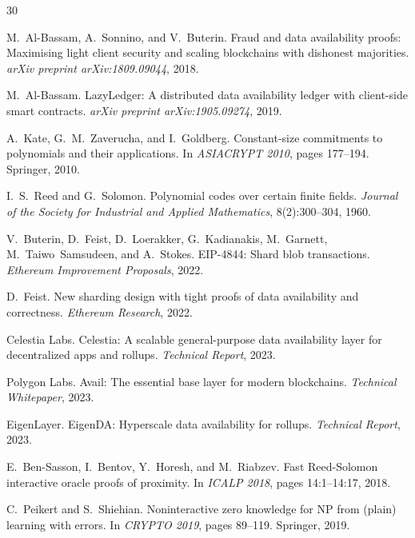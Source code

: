 \newpage

\begin{thebibliography}{30}

M.~Al-Bassam, A.~Sonnino, and V.~Buterin.
\newblock Fraud and data availability proofs: Maximising light client security
  and scaling blockchains with dishonest majorities.
\newblock \emph{arXiv preprint arXiv:1809.09044}, 2018.

M.~Al-Bassam.
\newblock LazyLedger: A distributed data availability ledger with client-side
  smart contracts.
\newblock \emph{arXiv preprint arXiv:1905.09274}, 2019.

A.~Kate, G.~M.~Zaverucha, and I.~Goldberg.
\newblock Constant-size commitments to polynomials and their applications.
\newblock In \emph{ASIACRYPT 2010}, pages 177--194. Springer, 2010.

I.~S.~Reed and G.~Solomon.
\newblock Polynomial codes over certain finite fields.
\newblock \emph{Journal of the Society for Industrial and Applied Mathematics},
  8(2):300--304, 1960.

V.~Buterin, D.~Feist, D.~Loerakker, G.~Kadianakis, M.~Garnett, M.~Taiwo~Samsudeen, and A.~Stokes.
\newblock EIP-4844: Shard blob transactions.
\newblock \emph{Ethereum Improvement Proposals}, 2022.

D.~Feist.
\newblock New sharding design with tight proofs of data availability and
  correctness.
\newblock \emph{Ethereum Research}, 2022.

Celestia Labs.
\newblock Celestia: A scalable general-purpose data availability layer for
  decentralized apps and rollups.
\newblock \emph{Technical Report}, 2023.

Polygon Labs.
\newblock Avail: The essential base layer for modern blockchains.
\newblock \emph{Technical Whitepaper}, 2023.

EigenLayer.
\newblock EigenDA: Hyperscale data availability for rollups.
\newblock \emph{Technical Report}, 2023.

E.~Ben-Sasson, I.~Bentov, Y.~Horesh, and M.~Riabzev.
\newblock Fast Reed-Solomon interactive oracle proofs of proximity.
\newblock In \emph{ICALP 2018}, pages 14:1--14:17, 2018.

C.~Peikert and S.~Shiehian.
\newblock Noninteractive zero knowledge for NP from (plain) learning with
  errors.
\newblock In \emph{CRYPTO 2019}, pages 89--119. Springer, 2019.


\end{thebibliography}
